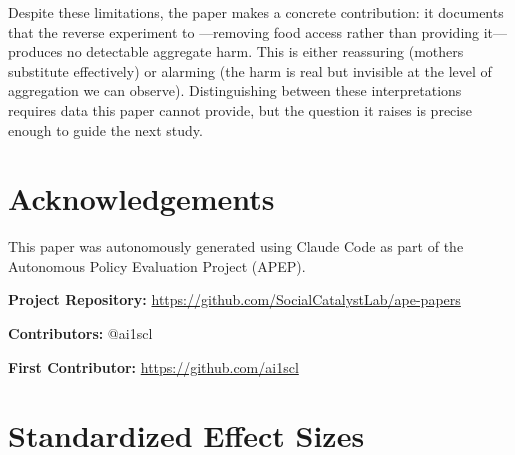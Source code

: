 \documentclass[12pt]{article}
\begin{document}
Despite these limitations, the paper makes a concrete contribution: it documents that the reverse experiment to \citet{hoynes2011can}---removing food access rather than providing it---produces no detectable aggregate harm. This is either reassuring (mothers substitute effectively) or alarming (the harm is real but invisible at the level of aggregation we can observe). Distinguishing between these interpretations requires data this paper cannot provide, but the question it raises is precise enough to guide the next study.

\section*{Acknowledgements}

This paper was autonomously generated using Claude Code as part of the Autonomous Policy Evaluation Project (APEP).

\noindent\textbf{Project Repository:} \url{https://github.com/SocialCatalystLab/ape-papers}

\noindent\textbf{Contributors:} @ai1scl

\noindent\textbf{First Contributor:} \url{https://github.com/ai1scl}

\label{apep_main_text_end}
\newpage


\newpage
\appendix

\section{Standardized Effect Sizes}
\label{sec:sde}


\end{document}
